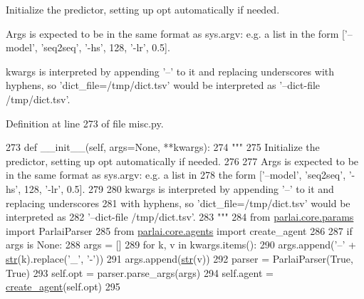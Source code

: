 \begin{DoxyVerb}Initialize the predictor, setting up opt automatically if needed.

Args is expected to be in the same format as sys.argv: e.g. a list in
the form ['--model', 'seq2seq', '-hs', 128, '-lr', 0.5].

kwargs is interpreted by appending '--' to it and replacing underscores
with hyphens, so 'dict_file=/tmp/dict.tsv' would be interpreted as
'--dict-file /tmp/dict.tsv'.
\end{DoxyVerb}
 

Definition at line 273 of file misc.\+py.


\begin{DoxyCode}
273     \textcolor{keyword}{def }\_\_init\_\_(self, args=None, **kwargs):
274         \textcolor{stringliteral}{"""}
275 \textcolor{stringliteral}{        Initialize the predictor, setting up opt automatically if needed.}
276 \textcolor{stringliteral}{}
277 \textcolor{stringliteral}{        Args is expected to be in the same format as sys.argv: e.g. a list in}
278 \textcolor{stringliteral}{        the form ['--model', 'seq2seq', '-hs', 128, '-lr', 0.5].}
279 \textcolor{stringliteral}{}
280 \textcolor{stringliteral}{        kwargs is interpreted by appending '--' to it and replacing underscores}
281 \textcolor{stringliteral}{        with hyphens, so 'dict\_file=/tmp/dict.tsv' would be interpreted as}
282 \textcolor{stringliteral}{        '--dict-file /tmp/dict.tsv'.}
283 \textcolor{stringliteral}{        """}
284         \textcolor{keyword}{from} \hyperlink{namespaceparlai_1_1core_1_1params}{parlai.core.params} \textcolor{keyword}{import} ParlaiParser
285         \textcolor{keyword}{from} \hyperlink{namespaceparlai_1_1core_1_1agents}{parlai.core.agents} \textcolor{keyword}{import} create\_agent
286 
287         \textcolor{keywordflow}{if} args \textcolor{keywordflow}{is} \textcolor{keywordtype}{None}:
288             args = []
289         \textcolor{keywordflow}{for} k, v \textcolor{keywordflow}{in} kwargs.items():
290             args.append(\textcolor{stringliteral}{'--'} + \hyperlink{namespacegenerate__task__READMEs_a5b88452ffb87b78c8c85ececebafc09f}{str}(k).replace(\textcolor{stringliteral}{'\_'}, \textcolor{stringliteral}{'-'}))
291             args.append(\hyperlink{namespacegenerate__task__READMEs_a5b88452ffb87b78c8c85ececebafc09f}{str}(v))
292         parser = ParlaiParser(\textcolor{keyword}{True}, \textcolor{keyword}{True})
293         self.opt = parser.parse\_args(args)
294         self.agent = \hyperlink{namespaceparlai_1_1core_1_1agents_ad0d54074d4bcc148bb415ab5515a53b5}{create\_agent}(self.opt)
295 
\end{DoxyCode}


